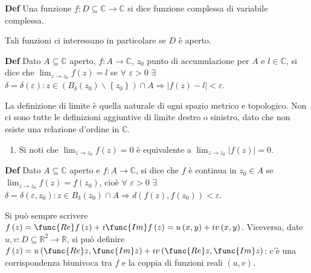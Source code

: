 \documentclass{article}
\begin{document}
\textbf{Def} Una funzione $f:D\subseteq 
\mathbb{C}
\rightarrow 
\mathbb{C}
$ si dice funzione complessa di variabile complessa.

Tali funzioni ci interessano in particolare se $D$ \`{e} aperto.

\textbf{Def} Dato $A\subseteq 
\mathbb{C}
$ aperto, $f:A\rightarrow 
\mathbb{C}
$, $z_{0}$ punto di accumulazione per $A$ e $l\in 
\mathbb{C}
$, si dice che $\lim_{z\rightarrow z_{0}}f\left( z\right) =l$ se $\forall $ $%
\varepsilon >0$ $\exists $ $\delta =\delta \left( \varepsilon \right) :z\in
\left( B_{\delta }\left( z_{0}\right) \backslash \left\{ z_{0}\right\}
\right) \cap A\Longrightarrow \left\vert f\left( z\right) -l\right\vert
<\varepsilon $.

La definizione di limite \`{e} quella naturale di ogni spazio metrico e
topologico. Non ci sono tutte le definizioni aggiuntive di limite destro o
sinistro, dato che non esiste una relazione d'ordine in $%
\mathbb{C}
$.

\begin{enumerate}
\item Si noti che $\lim_{z\rightarrow z_{0}}f\left( z\right) =0$ \`{e}
equivalente a $\lim_{z\rightarrow z_{0}}\left\vert f\left( z\right)
\right\vert =0$.
\end{enumerate}

\textbf{Def} Dato $A\subseteq 
\mathbb{C}
$ aperto e $f:A\rightarrow 
\mathbb{C}
$, si dice che $f$ \`{e} continua in $z_{0}\in A$ se $\lim_{z\rightarrow
z_{0}}f\left( z\right) =f\left( z_{0}\right) $, cio\`{e} $\forall $ $%
\varepsilon >0$ $\exists $ $\delta =\delta \left( \varepsilon ,z_{0}\right)
:z\in B_{\delta }\left( z_{0}\right) \cap A\Longrightarrow d\left( f\left(
z\right) ,f\left( z_{0}\right) \right) <\varepsilon $.

Si pu\`{o} sempre scrivere $f\left( z\right) =\func{Re}f\left( z\right) +i%
\func{Im}f\left( z\right) =u\left( x,y\right) +iv\left( x,y\right) $.
Viceversa, date $u,v:D\subseteq 
\mathbb{R}
^{2}\rightarrow 
\mathbb{R}
$, si pu\`{o} definire $f\left( z\right) =u\left( \func{Re}z,\func{Im}%
z\right) +iv\left( \func{Re}z,\func{Im}z\right) $: c'\`{e} una
corrispondenza biunivoca tra $f$ e la coppia di funzioni reali $\left(
u,v\right) $.
\end{document}
